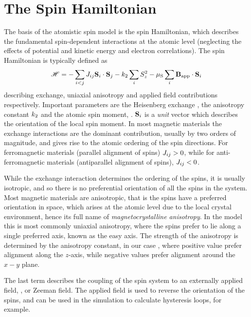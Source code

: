\section*{The Spin Hamiltonian}
The basis of the atomistic spin model is the spin Hamiltonian, which describes the fundamental spin-dependent interactions at the atomic level (neglecting the effects of potential and kinetic energy and electron correlations). The spin Hamiltonian is typically defined as 
\begin{equation*}
\mathscr{H} = - \sum_{i<j} J_{ij} \mathbf{S}_i \cdot \mathbf{S}_j - k_{2} \sum_{i} S_z^2 - \mu_\mathrm{S} \sum_i \mathbf{B}_{\mathrm{app}} \cdot \mathbf{S}_i
\end{equation*}
describing exchange, uniaxial anisotropy and applied field contributions respectively. Important parameters are the Heisenberg exchange \Jij, the anisotropy constant $k_{2}$ and the atomic spin moment, \smmu. $\mathbf{S}_i$ is a \textit{unit} vector which describes the orientation of the local spin moment. In most magnetic materials the exchange interactions are the dominant contribution, usually by two orders of magnitude, and gives rise to the atomic ordering of the spin directions. For ferromagnetic materials (parallel alignment of spins) $J_{ij} > 0$, while for anti-ferromagnetic materials (antiparallel alignment of spins), $J_{ij} < 0$. 

While the exchange interaction determines the ordering of the spins, it is usually isotropic, and so there is no preferential orientation of all the spins in the system. Most magnetic materials are anisotropic, that is the spins have a preferred orientation in space, which arises at the atomic level due to the local crystal environment, hence its full name of \textit{magnetocrystalline anisotropy}. In the model this is most commonly uniaxial anisotropy, where the spins prefer to lie along a single preferred axis, known as the easy axis. The strength of the anisotropy is determined by the anisotropy constant, in our case \kuu, where positive value prefer alignment along the $z$-axis, while negative values prefer alignment around the $x-y$ plane. 

The last term describes the coupling of the spin system to an externally applied field, \Happ, or Zeeman field. The applied field is used to reverse the orientation of the spins, and can be used in the simulation to calculate hysteresis loops, for example.

